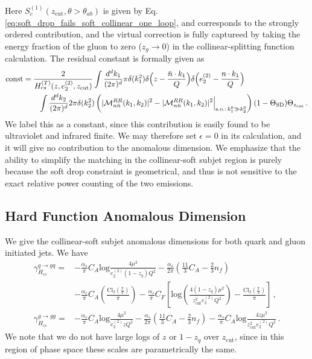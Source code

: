 \documentclass[a4paper,11pt]{article}
\newcommand{\nbar}{{\bar n}}
\newcommand{\ecf}[2]{e_{#1}^{(#2)}}
\def\log{\text{log}}
\def\zcut{z_{\text{cut}}}
\def\nbar{\bar n}
\begin{document}
Here $S^{(1)}_{c}(\zcut,\theta>\theta_{ab})$ is given by Eq. \eqref{eq:soft_drop_fails_soft_collinear_one_loop}, and corresponds to the strongly ordered contribution, and the virtual correction is fully captureed by taking the energy fraction of the gluon to zero ($z_g\rightarrow 0$) in the collinear-splitting function calculation. The residual constant is formally given as
{\small\begin{align}
\text{const}&=\frac{2}{H_{cs}^{(T)}(z,\ecf{2}{2},\zcut)}\int \frac{d^dk_1}{(2\pi)^d} \pi\delta(k_1^2)\delta\Big(z-\frac{\nbar\cdot k_1}{Q}\Big)\delta\Big(\ecf{2}{2}-\frac{n\cdot k_1}{Q}\Big)\nonumber\\
&\qquad\int \frac{d^dk_2}{(2\pi)^d} 2\pi\delta(k_2^2)\left( |{\cal M}^{RR}_{n\nbar}(k_1,k_2)|^2-|{\cal M}^{RR}_{n\nbar}(k_1,k_2)|^2\Big |_{\text{s.o.:}\, k_1^0\gg k_2^0}\right)(1-\Theta_{\text{SD}})\Theta_{\zcut}\,.
\end{align}}
We label this as a constant, since this contribution is easily found to be ultraviolet and infrared finite. We may therefore set $\epsilon=0$ in its calculation, and it will give no contribution to the anomalous dimension. We emphasize that the ability to simplify the matching in the collinear-soft subjet region is purely because the soft drop constraint is geometrical, and thus is not sensitive to the exact relative power counting of the two emissions.

\subsection{Hard Function Anomalous Dimension}\label{app:hardfunc_cs_anom_dim}
We give the collinear-soft subjet anomalous dimensions for both quark and gluon initiated jets. We have
{\small\begin{align}\label{eq:collinear_soft_subjet_hard_matching_anom_dim}
\gamma_{H_{cs}}^{q\rightarrow gq}=& -\frac{\alpha_s}{\pi}C_A\log\frac{4\mu^2}{\ecf{2}{2}(1-z_q)Q^2}-\frac{\alpha_s}{2\pi}\left(
\frac{11}{3}C_A-\frac{2}{3}n_f\right)\nonumber\\
&-\frac{\alpha_s}{\pi}C_A \left(
\frac{\text{Cl}_2(\frac{\pi}{3})}{\pi}
\right)-\frac{\alpha_s}{\pi}C_F\left[
\log \left( \frac{4 (1-z_q)\mu^2}{\zcut^2\ecf{2}{2}Q^2} \right )-\frac{\text{Cl}_2(\frac{\pi}{3})}{\pi}
\right]\,,\\
\gamma_{H_{cs}}^{g\rightarrow gg}=& -\frac{\alpha_s}{\pi}C_A\log\frac{4\mu^2}{\ecf{2}{2}zQ^2}-\frac{\alpha_s}{2\pi}\left(
\frac{11}{3}C_A-\frac{2}{3}n_f\right)-\frac{\alpha_s}{\pi}C_A
\log\frac{4 z\mu^2}{\zcut^2\ecf{2}{2}Q^2}
\,.
\end{align} }
We note that we do not have large logs of $z$ or $1-z_q$ over $\zcut$, since in this region of phase space these scales are parametrically the same.
\end{document}
